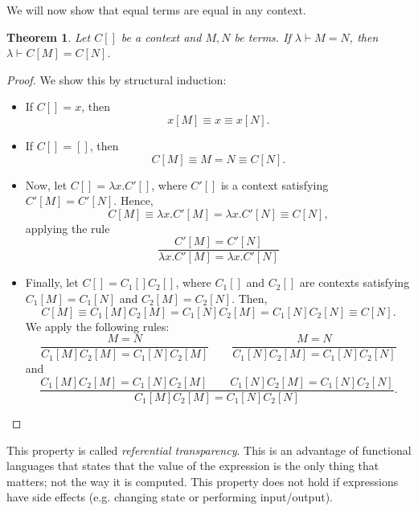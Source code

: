 \documentclass[a4paper, openany]{memoir}
\newtheorem{theorem}[proposition]{Theorem}
\theoremstyle{definition}
\begin{document}
    We will now show that equal terms are equal in any context.
    \begin{theorem}
        Let $C[]$ be a context and $M, N$ be terms. If $\lambda \vdash M = N$, then $\lambda \vdash C[M] = C[N]$.
    \end{theorem}
    \begin{proof}
        We show this by structural induction:
        \begin{itemize}
            \item If $C[] = x$, then
            \[x[M] \equiv x \equiv x[N].\]

            \item If $C[] = []$, then
            \[C[M] \equiv M = N \equiv C[N].\]

            \item Now, let $C[] = \lambda x.C'[]$, where $C'[]$ is a context satisfying $C'[M] = C'[N]$. Hence,
            \[C[M] \equiv \lambda x.C'[M] = \lambda x.C'[N] \equiv C[N],\]
            applying the rule
           \[\frac{C'[M] = C'[N]}{\lambda x.C'[M] = \lambda x.C'[N]}\] 

           \item Finally, let $C[] = C_1[] C_2[]$, where $C_1[]$ and $C_2[]$ are contexts satisfying $C_1[M] = C_1[N]$ and $C_2[M] = C_2[N]$. Then,
           \[C[M] \equiv C_1[M] C_2[M] = C_1[N] C_2[M] = C_1[N] C_2[N] \equiv C[N].\]
           We apply the following rules:
           \[\frac{M = N}{C_1[M] C_2[M] = C_1[N] C_2[M]} \qquad \frac{M = N}{C_1[N] C_2[M] = C_1[N] C_2[N]}\]
           and
           \[\frac{C_1[M] C_2[M] = C_1[N] C_2[M] \qquad C_1[N] C_2[M] = C_1[N] C_2[N]}{C_1[M] C_2[M] = C_1[N] C_2[N]}.\]
        \end{itemize}
    \end{proof}
    \noindent This property is called \emph{referential transparency}. This is an advantage of functional languages that states that the value of the expression is the only thing that matters; not the way it is computed. This property does not hold if expressions have side effects (e.g. changing state or performing input/output).
\end{document}
